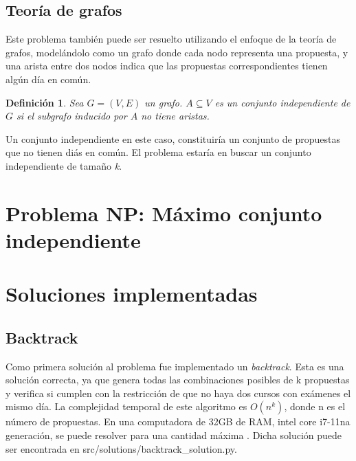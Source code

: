 \documentclass[10pt]{article} %
\newtheorem{mydef}{Definici\'on}%
\begin{document}
	
	\subsection{Teor\'ia de grafos}
	Este problema tambi\'en puede ser resuelto utilizando el enfoque de la teoría de grafos, model\'andolo como un grafo donde cada nodo representa una propuesta, y una arista entre dos nodos indica que las propuestas correspondientes tienen alg\'un d\'ia en com\'un. 
	
	\begin{mydef}
		Sea $G = (V, E)$ un grafo. $A \subseteq V$ es un conjunto independiente de $G$ si el subgrafo inducido por $A$ no tiene aristas.  
	\end{mydef}
	
	Un conjunto independiente en este caso, constituir\'ia un conjunto de propuestas que no tienen di\'as en com\'un. El problema estar\'ia en buscar un conjunto independiente de tama\~no \textit{k}.
	
	\section{Problema NP: M\'aximo conjunto independiente}
	
	\section{Soluciones implementadas}
	
	\subsection{Backtrack}
	
		Como primera solución al problema fue implementado un \textit{backtrack}. Esta es una solución correcta, ya que  genera todas las combinaciones posibles de k propuestas y verifica si cumplen con la restricción de que no haya dos cursos con exámenes el mismo día. La complejidad temporal de este algoritmo es $O(n^k)$, donde n es el número de propuestas. En una computadora de 32GB de RAM, intel core i7-11na generación, se puede resolver para una cantidad máxima . Dicha solución puede ser encontrada en src/solutions/backtrack\_solution.py.
		
\end{document}
